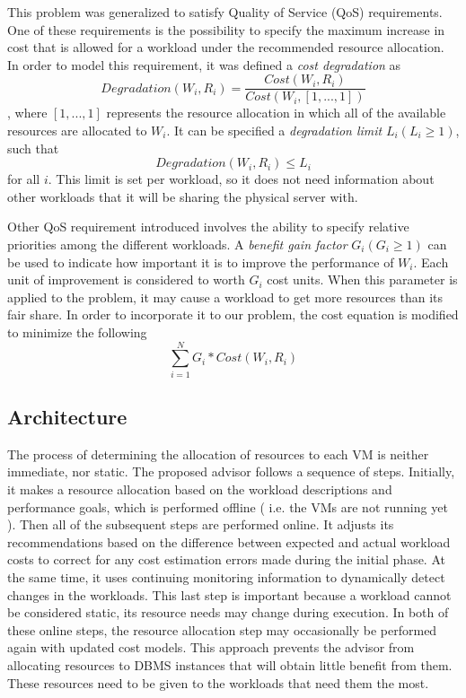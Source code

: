 \documentclass[jidm,a4paper]{jidm} %
\begin{document}
This problem was generalized to satisfy Quality of Service (QoS) requirements. One of these requirements is the possibility to specify the maximum increase in cost that is allowed for a workload under the recommended resource allocation. In order to model this requirement, it was defined a \textit{cost degradation} as
\[
 Degradation(W_{i},R_{i}) = \frac{Cost(W_{i},R_{i})}{Cost(W_{i},[1,...,1])}
\]
, where $[1,...,1]$ represents the resource allocation in which all of the available resources are allocated to $W_{i}$. It can be specified a \textit{degradation limit} $L_{i} ( L_{i} \geq 1 )$, such that 
\[
 Degradation(W_{i}, R_{i}) \leq L_{i}
\]
for all $i$. This limit is set per workload, so it does not need information about other workloads that it will be sharing the physical server with.

Other QoS requirement introduced involves the ability to specify relative priorities among the different workloads. A \textit{benefit gain factor} $G_{i} (G_{i} \geq 1)$ can be used to indicate how important it is to improve the performance of $W_{i}$. Each unit of improvement is considered to worth $G_{i}$ cost units. When this parameter is applied to the problem, it may cause a workload to get more resources than its fair share. In order to incorporate it to our problem, the cost equation is modified to minimize the following
\[
  \sum_{i=1}^{N} G_{i} * Cost(W_{i},R_{i})
\]


\subsection{Architecture}

The process of  determining the allocation of resources to each VM is neither immediate, nor static. The proposed advisor follows a sequence of steps. Initially, it makes a resource allocation based on the workload descriptions and performance goals, which is performed offline ( i.e. the VMs are not running yet ). Then all of the subsequent steps are performed online. It adjusts its recommendations based on the difference between expected and actual workload costs to correct for any cost estimation errors made during the initial phase. At the same time, it uses continuing monitoring information to dynamically detect changes in the workloads. This last step is important because a workload cannot be considered static, its resource needs may change during execution. In both of these online steps, the resource allocation step may occasionally be performed again with updated cost models. This approach prevents the advisor from allocating resources to DBMS instances that will obtain little benefit from them. These 
resources need to be given to the workloads that need them the most.
\end{document}

